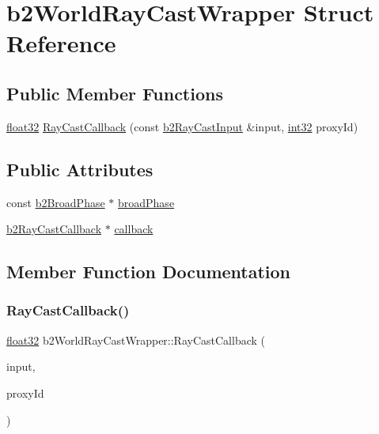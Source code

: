\hypertarget{structb2_world_ray_cast_wrapper}{}\section{b2\+World\+Ray\+Cast\+Wrapper Struct Reference}
\label{structb2_world_ray_cast_wrapper}
\subsection*{Public Member Functions}
\begin{DoxyCompactItemize}
\item 
\mbox{\hyperlink{b2_settings_8h_aacdc525d6f7bddb3ae95d5c311bd06a1}{float32}} \mbox{\hyperlink{structb2_world_ray_cast_wrapper_a336aa5b664c3cfea61b0e28066f796d4}{Ray\+Cast\+Callback}} (const \mbox{\hyperlink{structb2_ray_cast_input}{b2\+Ray\+Cast\+Input}} \&input, \mbox{\hyperlink{b2_settings_8h_a43d43196463bde49cb067f5c20ab8481}{int32}} proxy\+Id)
\end{DoxyCompactItemize}
\subsection*{Public Attributes}
\begin{DoxyCompactItemize}
\item 
const \mbox{\hyperlink{classb2_broad_phase}{b2\+Broad\+Phase}} $\ast$ \mbox{\hyperlink{structb2_world_ray_cast_wrapper_a8bf380db0756a568bec076e549544145}{broad\+Phase}}
\item 
\mbox{\hyperlink{classb2_ray_cast_callback}{b2\+Ray\+Cast\+Callback}} $\ast$ \mbox{\hyperlink{structb2_world_ray_cast_wrapper_a5e6d85af5ae2cda7a8da2306d6b86a3e}{callback}}
\end{DoxyCompactItemize}


\subsection{Member Function Documentation}
\mbox{\label{structb2_world_ray_cast_wrapper_a336aa5b664c3cfea61b0e28066f796d4}} 
\subsubsection{\texorpdfstring{RayCastCallback()}{RayCastCallback()}}
{\footnotesize\ttfamily \mbox{\hyperlink{b2_settings_8h_aacdc525d6f7bddb3ae95d5c311bd06a1}{float32}} b2\+World\+Ray\+Cast\+Wrapper\+::\+Ray\+Cast\+Callback (\begin{DoxyParamCaption}\item[{const \mbox{\hyperlink{structb2_ray_cast_input}{b2\+Ray\+Cast\+Input}} \&}]{input,  }\item[{\mbox{\hyperlink{b2_settings_8h_a43d43196463bde49cb067f5c20ab8481}{int32}}}]{proxy\+Id }\end{DoxyParamCaption})\hspace{0.3cm}{\ttfamily [inline]}}



